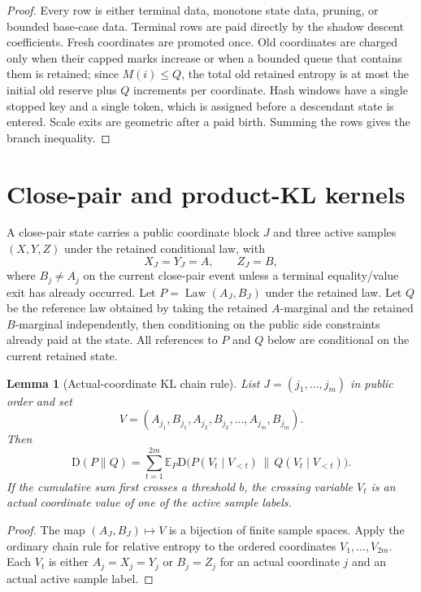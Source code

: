 \documentclass[11pt]{article}
\newtheorem{lemma}[theorem]{Lemma}
\theoremstyle{remark}
\newcommand{\E}{\mathbb E}
\newcommand{\KL}{\mathrm D}
\newcommand{\Law}{\operatorname{Law}}
\begin{document}
\begin{proof}
Every row is either terminal data, monotone state data, pruning, or bounded base-case data.  Terminal rows are paid directly by the shadow descent coefficients.  Fresh coordinates are promoted once.  Old coordinates are charged only when their capped marks increase or when a bounded queue that contains them is retained; since $M(i)\le Q$, the total old retained entropy is at most the initial old reserve plus $Q$ increments per coordinate.  Hash windows have a single stopped key and a single token, which is assigned before a descendant state is entered.  Scale exits are geometric after a paid birth.  Summing the rows gives the branch inequality.
\end{proof}

\section{Close-pair and product-KL kernels}\label{app:close-product}

A close-pair state carries a public coordinate block $J$ and three active samples $(X,Y,Z)$ under the retained conditional law, with
\[
        X_J=Y_J=A,\qquad Z_J=B,
\]
where $B_j\ne A_j$ on the current close-pair event unless a terminal equality/value exit has already occurred.  Let $P=\Law(A_J,B_J)$ under the retained law.  Let $Q$ be the reference law obtained by taking the retained $A$-marginal and the retained $B$-marginal independently, then conditioning on the public side constraints already paid at the state.  All references to $P$ and $Q$ below are conditional on the current retained state.

\begin{lemma}[Actual-coordinate KL chain rule]\label{lem:actual-kl-chain}
List $J=(j_1,\ldots,j_m)$ in public order and set
\[
        V=(A_{j_1},B_{j_1},A_{j_2},B_{j_2},\ldots,A_{j_m},B_{j_m}).
\]
Then
\[
        \KL(P\|Q)=\sum_{t=1}^{2m}\E_P\KL\bigl(P(V_t\mid V_{<t})\,\|\,Q(V_t\mid V_{<t})\bigr).
\]
If the cumulative sum first crosses a threshold $b$, the crossing variable $V_t$ is an actual coordinate value of one of the active sample labels.
\end{lemma}

\begin{proof}
The map $(A_J,B_J)\mapsto V$ is a bijection of finite sample spaces.  Apply the ordinary chain rule for relative entropy to the ordered coordinates $V_1,\ldots,V_{2m}$.  Each $V_t$ is either $A_j=X_j=Y_j$ or $B_j=Z_j$ for an actual coordinate $j$ and an actual active sample label.
\end{proof}
\end{document}
